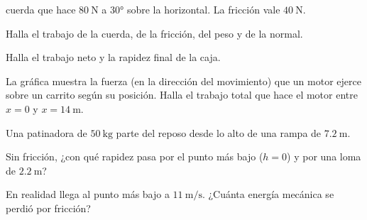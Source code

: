 \documentclass[11pt,a4paper]{article}
\begin{document}
\begin{ejercicios}
  cuerda que hace $\SI{80}{\newton}$ a \ang{30} sobre la horizontal. La fricción vale $\SI{40}{\newton}$.
  \begin{ejercicios}
  \item Halla el trabajo de la cuerda, de la fricción, del peso y de la normal.
  \item Halla el trabajo neto y la rapidez final de la caja.
  \end{ejercicios}
\item La gráfica muestra la fuerza (en la dirección del movimiento) que un motor ejerce sobre un carrito según su
  posición. Halla el trabajo total que hace el motor entre $x=0$ y $x=\SI{14}{\meter}$.

  \begin{center}
  \end{center}
\item Una patinadora de $\SI{50}{\kilo\gram}$ parte del reposo desde lo alto de una rampa de $\SI{7.2}{\meter}$.
  \begin{ejercicios}
  \item Sin fricción, ¿con qué rapidez pasa por el punto más bajo ($h=0$) y por una loma de $\SI{2.2}{\meter}$?
  \item En realidad llega al punto más bajo a $\SI{11}{\meter\per\second}$. ¿Cuánta energía mecánica se perdió por fricción?
  \end{ejercicios}
\end{ejercicios}
\end{document}
